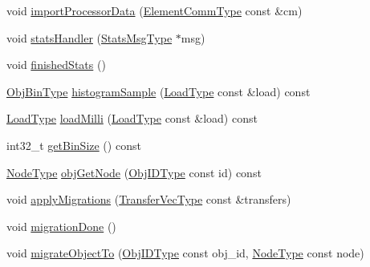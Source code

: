 \begin{DoxyCompactItemize}
\item 
void \hyperlink{structvt_1_1vrt_1_1collection_1_1lb_1_1_base_l_b_a8be79f770959dc91e8e95e5208afefa9}{import\+Processor\+Data} (\hyperlink{structvt_1_1vrt_1_1collection_1_1lb_1_1_base_l_b_ac3f8560bfe41aa593eb7d5bd1241cc4c}{Element\+Comm\+Type} const \&cm)
\item 
void \hyperlink{structvt_1_1vrt_1_1collection_1_1lb_1_1_base_l_b_a0caca58b47838888ed2b4c3987bd9745}{stats\+Handler} (\hyperlink{structvt_1_1vrt_1_1collection_1_1lb_1_1_base_l_b_a0cddaecd9e8450190585d0607a3439f1}{Stats\+Msg\+Type} $\ast$msg)
\item 
void \hyperlink{structvt_1_1vrt_1_1collection_1_1lb_1_1_base_l_b_a4bfffbc4de6887a89f5ec5561a7bccdd}{finished\+Stats} ()
\item 
\hyperlink{structvt_1_1vrt_1_1collection_1_1lb_1_1_base_l_b_ae0bff8fcf0dec0abc1d81836cf1d060a}{Obj\+Bin\+Type} \hyperlink{structvt_1_1vrt_1_1collection_1_1lb_1_1_base_l_b_a73ede03ca02dc385fcde2bd067978a4a}{histogram\+Sample} (\hyperlink{structvt_1_1vrt_1_1collection_1_1lb_1_1_base_l_b_a215e22b9f12678303f49615ae3be05cc}{Load\+Type} const \&load) const
\item 
\hyperlink{structvt_1_1vrt_1_1collection_1_1lb_1_1_base_l_b_a215e22b9f12678303f49615ae3be05cc}{Load\+Type} \hyperlink{structvt_1_1vrt_1_1collection_1_1lb_1_1_base_l_b_a9293a46022910a7b0b93938dfb886477}{load\+Milli} (\hyperlink{structvt_1_1vrt_1_1collection_1_1lb_1_1_base_l_b_a215e22b9f12678303f49615ae3be05cc}{Load\+Type} const \&load) const
\item 
int32\+\_\+t \hyperlink{structvt_1_1vrt_1_1collection_1_1lb_1_1_base_l_b_ae09296e84f0ffec68a169dcec197ec26}{get\+Bin\+Size} () const
\item 
\hyperlink{namespacevt_a866da9d0efc19c0a1ce79e9e492f47e2}{Node\+Type} \hyperlink{structvt_1_1vrt_1_1collection_1_1lb_1_1_base_l_b_a9c01cfa62a37b6c1fd9b2d8791bbcacc}{obj\+Get\+Node} (\hyperlink{structvt_1_1vrt_1_1collection_1_1lb_1_1_base_l_b_a15a2f756b59c8c2437985206b32aa403}{Obj\+I\+D\+Type} const id) const
\item 
void \hyperlink{structvt_1_1vrt_1_1collection_1_1lb_1_1_base_l_b_a7330de226a184378fc6230a56f525ef6}{apply\+Migrations} (\hyperlink{structvt_1_1vrt_1_1collection_1_1lb_1_1_base_l_b_a329e8179ec41a1bd4924c79fe23a79af}{Transfer\+Vec\+Type} const \&transfers)
\item 
void \hyperlink{structvt_1_1vrt_1_1collection_1_1lb_1_1_base_l_b_ac8ed2cc09aec1f84e179ba734da71960}{migration\+Done} ()
\item 
void \hyperlink{structvt_1_1vrt_1_1collection_1_1lb_1_1_base_l_b_a952846044ca0d13d25ca828b84112d0e}{migrate\+Object\+To} (\hyperlink{structvt_1_1vrt_1_1collection_1_1lb_1_1_base_l_b_a15a2f756b59c8c2437985206b32aa403}{Obj\+I\+D\+Type} const obj\+\_\+id, \hyperlink{namespacevt_a866da9d0efc19c0a1ce79e9e492f47e2}{Node\+Type} const node)

\end{DoxyCompactItemize}
